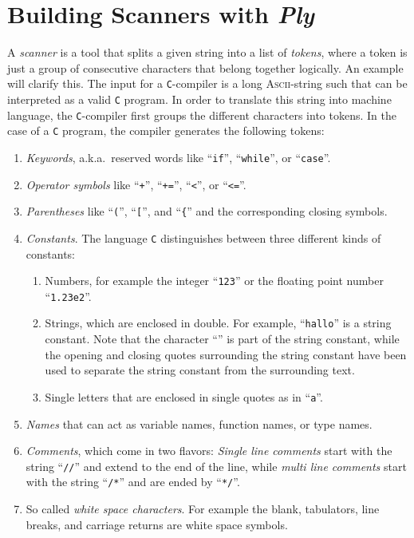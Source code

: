 \chapter{Building Scanners with \textsl{Ply}}
A  \emph{scanner} is a tool that splits a given string into a list of \emph{tokens}, where a token is
just a group of consecutive characters that belong together logically.  An example will clarify this.  
The input for a \texttt{C}-compiler is a long \textsc{Ascii}-string such that can be interpreted as a
valid \texttt{C} program.  In order to translate this string into machine language, the
\texttt{C}-compiler first groups the different characters into tokens.  In the case of a \texttt{C}
program, the compiler generates the following tokens:
\begin{enumerate}
\item \emph{Keywords}, a.k.a.~reserved words like ``\texttt{if}'', ``\texttt{while}'', or ``\texttt{case}''.
\item \emph{Operator symbols} like ``\texttt{+}'', ``\texttt{+=}'', ``\texttt{<}'', or
      ``\texttt{<=}''. 
\item \emph{Parentheses} like ``\texttt{(}'', ``\texttt{[}'', and ``\texttt{\{}'' and the
      corresponding closing symbols.
\item \emph{Constants}.  The language \texttt{C} distinguishes between three different kinds of constants:
      \begin{enumerate}
      \item Numbers, for example the integer ``\texttt{123}'' or the floating point number ``\texttt{1.23e2}''.
      \item Strings, which are enclosed in double.  For example,
            ``\texttt{hallo}'' is a string constant.  Note that the character
            ``\texttt{}'' is part of the string constant, while the opening and closing
            quotes surrounding the string constant have been used to separate the string constant
            from the surrounding text. 
      \item Single letters that are enclosed in single quotes as in
            ``\texttt{a}''.
      \end{enumerate}
\item \emph{Names} that can act as variable names, function names, or type names.
\item \emph{Comments}, which come in two flavors:  \emph{Single line comments} start with the string
      ``\texttt{//}'' and extend to the end of the line, while \emph{multi line comments} start with
      the string ``\texttt{/*}'' and are ended by ``\texttt{*/}''.
\item So called \emph{white space characters}.  For example the blank, tabulators, line breaks, and
      carriage returns are white space symbols.
\end{enumerate}

